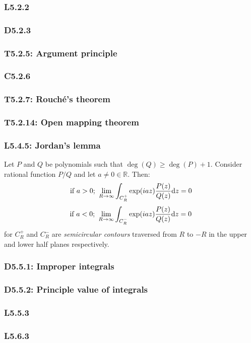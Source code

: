 \documentclass{article}
\begin{document}
\begin{multicols*}{3}
\subsubsection*{L5.2.2}

\subsubsection*{D5.2.3}

\subsubsection*{T5.2.5: Argument principle}

\subsubsection*{C5.2.6}

\subsubsection*{T5.2.7: Rouch\'e's theorem}

\subsubsection*{T5.2.14: Open mapping theorem}

\subsubsection*{L5.4.5: Jordan's lemma}
Let $P$ and $Q$ be polynomials such that $\deg(Q)\geq\deg(P)+1$.
Consider rational function $P/Q$ and let $a\neq0\in\mathbb{R}$. Then:
$$\text{if $a>0$;}\hspace{0.05in}\lim_{R\rightarrow\infty}
\int_{C_R^+}\exp(iaz)\frac{P(z)}{Q(z)}\dd z=0$$
$$\text{if $a<0$;}\hspace{0.05in}\lim_{R\rightarrow\infty}
\int_{C_R^-}\exp(iaz)\frac{P(z)}{Q(z)}\dd z=0$$
for $C_R^+$ and $C_R^-$ are \textit{semicircular contours}
traversed from $R$ to $-R$ in the upper and lower half planes
respectively.

\newcolumn

\subsubsection*{D5.5.1: Improper integrals}

\subsubsection*{D5.5.2: Principle value of integrals}

\subsubsection*{L5.5.3}

\subsubsection*{L5.6.3}

\end{multicols*}
\end{document}
